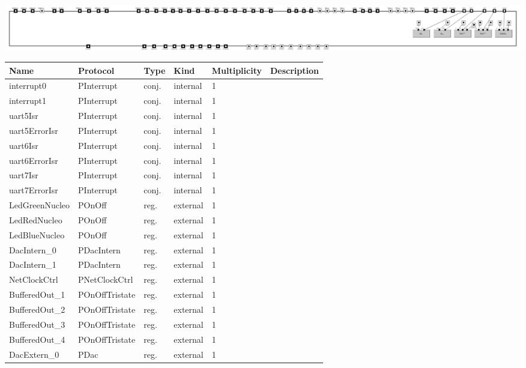 
{
\centering{}
\includegraphics[width=1.0\textwidth]{./images/ASimulationPlatformHW_1_0_structure.jpg}
}

\begin{tabular}[ht]{|l|l|l|l|l|p{5cm}|}
\hline
\textbf{Name} & \textbf{Protocol} & \textbf{Type} & \textbf{Kind} & \textbf{Multiplicity} & \textbf{Description}\\
\hline
interrupt0 & PInterrupt & conj. & internal & 1 & \\
\hline
interrupt1 & PInterrupt & conj. & internal & 1 & \\
\hline
uart5Isr & PInterrupt & conj. & internal & 1 & \\
\hline
uart5ErrorIsr & PInterrupt & conj. & internal & 1 & \\
\hline
uart6Isr & PInterrupt & conj. & internal & 1 & \\
\hline
uart6ErrorIsr & PInterrupt & conj. & internal & 1 & \\
\hline
uart7Isr & PInterrupt & conj. & internal & 1 & \\
\hline
uart7ErrorIsr & PInterrupt & conj. & internal & 1 & \\
\hline
LedGreenNucleo & POnOff & reg. & external & 1 & \\
\hline
LedRedNucleo & POnOff & reg. & external & 1 & \\
\hline
LedBlueNucleo & POnOff & reg. & external & 1 & \\
\hline
DacIntern\_0 & PDacIntern & reg. & external & 1 & \\
\hline
DacIntern\_1 & PDacIntern & reg. & external & 1 & \\
\hline
NetClockCtrl & PNetClockCtrl & reg. & external & 1 & \\
\hline
BufferedOut\_1 & POnOffTristate & reg. & external & 1 & \\
\hline
BufferedOut\_2 & POnOffTristate & reg. & external & 1 & \\
\hline
BufferedOut\_3 & POnOffTristate & reg. & external & 1 & \\
\hline
BufferedOut\_4 & POnOffTristate & reg. & external & 1 & \\
\hline
DacExtern\_0 & PDac & reg. & external & 1 & \\

\end{tabular}
